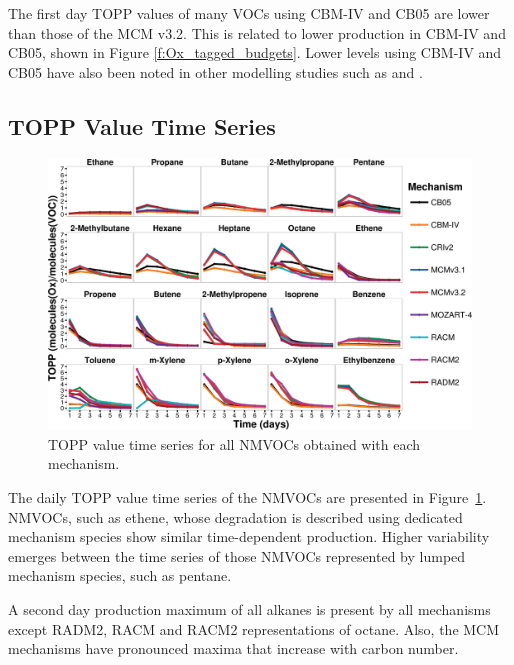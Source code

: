 The first day TOPP values of many VOCs using CBM-IV and CB05 are lower than those of the MCM v3.2. 
This is related to lower  production in CBM-IV and CB05, shown in Figure \ref{f:Ox_tagged_budgets}.
Lower  levels using CBM-IV and CB05 have also been noted in other modelling studies such as \citet{Luecken:2008, Emmerson:2009} and \citet{Saylor:2012}.

\subsection{TOPP Value Time Series} \label{ss:profiles} %

\begin{figure}
    \begin{center}
        \includegraphics[width=\textwidth]{img/TOPP_daily_values_all_species}
    \end{center}
    \caption{TOPP value time series for all NMVOCs obtained with each mechanism.}
    \label{f:TOPP_dailies}
\end{figure}

The daily TOPP value time series of the NMVOCs are presented in \mbox{Figure \ref{f:TOPP_dailies}}. 
NMVOCs, such as ethene, whose degradation is described using dedicated mechanism species show similar time-dependent  production.
Higher variability emerges between the time series of those NMVOCs represented by lumped mechanism species, such as pentane.

A second day  production maximum of all alkanes is present by all mechanisms except RADM2, RACM and RACM2 representations of octane. 
Also, the MCM mechanisms have pronounced maxima that increase with carbon number.

